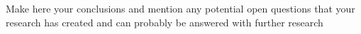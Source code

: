 \documentclass[main.tex]{subfiles}
\begin{document}
	Make here your conclusions and mention any potential open questions that
	your research has created and can probably be answered with further research
\end{document}
